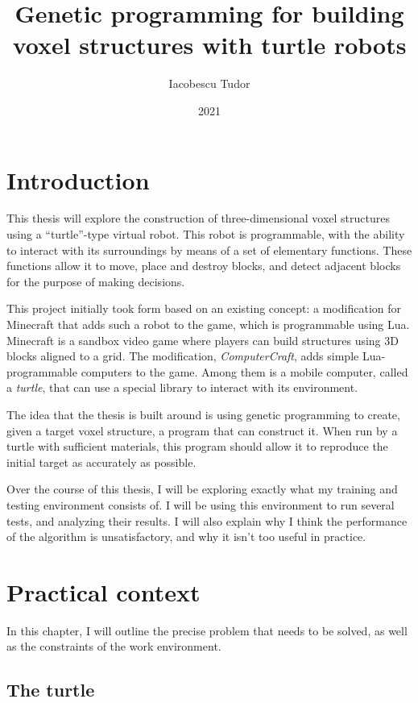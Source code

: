 \documentclass{report}
\title{Genetic programming for building voxel structures with turtle robots}
\author{Iacobescu Tudor}
\date{2021}
\begin{document}

\maketitle

\tableofcontents

\chapter{Introduction}
This thesis will explore the construction of three-dimensional voxel structures using a “turtle”-type virtual robot. This robot is programmable, with the ability to interact with its surroundings by means of a set of elementary functions. These functions allow it to move, place and destroy blocks, and detect adjacent blocks for the purpose of making decisions.

This project initially took form based on an existing concept: a modification for Minecraft\cite{minecraft} that adds such a robot to the game, which is programmable using Lua. Minecraft is a sandbox video game where players can build structures using 3D blocks aligned to a grid. The modification, \emph{ComputerCraft}\cite{computercraft}, adds simple Lua-programmable computers to the game. Among them is a mobile computer, called a \emph{turtle}, that can use a special library to interact with its environment.

The idea that the thesis is built around is using genetic programming\cite{genetic_prog} to create, given a target voxel structure, a program that can construct it. When run by a turtle with sufficient materials, this program should allow it to reproduce the initial target as accurately as possible.

Over the course of this thesis, I will be exploring exactly what my training and testing environment consists of. I will be using this environment to run several tests, and analyzing their results. I will  also explain why I think the performance of the algorithm is unsatisfactory, and why it isn't too useful in practice.

\chapter{Practical context}
In this chapter, I will outline the precise problem that needs to be solved, as well as the constraints of the work environment.

\section{The turtle}
\label{sec:turtle}
\end{document}
